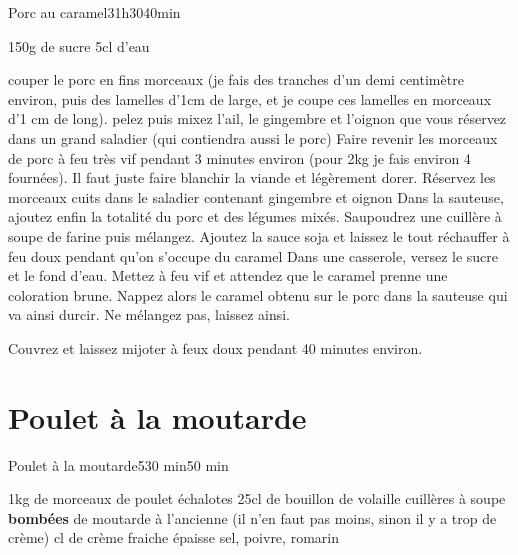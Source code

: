 {\begin{recette}{Porc au caramel}{3}{1h30}{40min}
\begin{ingredients}
\ingredient 150g de sucre
\ingredient 5cl d'eau
\end{ingredients}

\begin{preparation}
\etape couper le porc en fins morceaux (je fais des tranches d'un demi centimètre environ, puis des lamelles d'1cm de large, et
je coupe ces lamelles en morceaux d'1 cm de long).
\etape pelez puis mixez l'ail, le gingembre et l'oignon que vous réservez dans un grand saladier (qui contiendra aussi le porc)
\etape Faire revenir les morceaux de porc à feu très vif pendant 3 minutes environ (pour 2kg je fais environ 4 fournées). Il
faut juste faire blanchir la viande et légèrement dorer. Réservez les morceaux cuits dans le saladier contenant gingembre et
oignon
\etape Dans la sauteuse, ajoutez enfin la totalité du porc et des légumes mixés. 
\etape Saupoudrez une cuillère à soupe de farine puis mélangez. 
\etape Ajoutez la sauce soja et laissez le tout réchauffer à feu doux pendant qu'on s'occupe du caramel
\etape Dans une casserole, versez le sucre et le fond d'eau. Mettez à feu vif et attendez que le caramel prenne une coloration
brune.
\etape Nappez alors le caramel obtenu sur le porc dans la sauteuse qui va ainsi durcir. Ne mélangez pas, laissez ainsi.
\end{preparation}

\begin{cuisson}
Couvrez et laissez mijoter à feux doux pendant 40 minutes environ.
\end{cuisson}
\end{recette}

\section{Poulet à la moutarde}
\begin{recette}{Poulet à la moutarde}{5}{30 min}{50 min}
\begin{ingredients}[6 pers.]
\ingredient 1kg de morceaux de poulet
 échalotes
\ingredient 25cl de bouillon de volaille
 cuillères à soupe \textbf{bombées} de moutarde à l'ancienne (il n'en faut pas moins, sinon il y a trop de crème)
 cl de crème fraiche épaisse
\ingredient sel, poivre, romarin
\end{ingredients}


\end{recette}}
